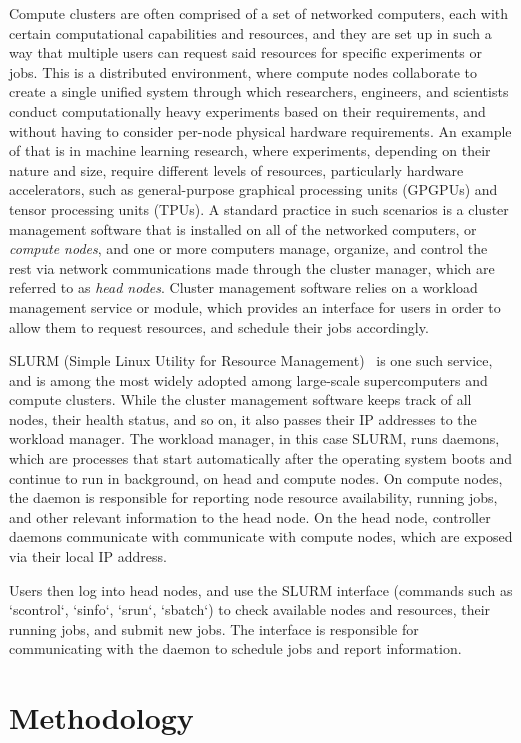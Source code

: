 \documentclass[sigconf]{acmart}
\begin{document}
Compute clusters are often comprised of a set of networked computers, each with certain computational capabilities and 
resources, and they are set up in such a way that multiple users can request said resources for specific experiments or jobs.
This is a distributed environment, where compute nodes collaborate to create a single unified system through which
researchers, engineers, and scientists conduct computationally heavy experiments based on their requirements, and without having
to consider per-node physical hardware requirements.
An example of that is in machine learning research, where experiments, depending on their nature and size, require different
levels of resources, particularly hardware accelerators, such as general-purpose graphical processing units (GPGPUs) and tensor
processing units (TPUs).
A standard practice in such scenarios is a cluster management software that is installed on all of the networked computers, or
\textit{compute nodes}, and one or more computers manage, organize, and control the rest via network communications made through
the cluster manager, which are referred to as \textit{head nodes}.
Cluster management software relies on a workload management service or module, which provides an interface for users in
order to allow them to request resources, and schedule their jobs accordingly.

SLURM (Simple Linux Utility for Resource Management)~\cite{yoo2003slurm} is one such service, and is among the most widely 
adopted among large-scale supercomputers and compute clusters.
While the cluster management software keeps track of all nodes, their health status, and so on, it also passes their IP 
addresses to the workload manager.
The workload manager, in this case SLURM, runs daemons, which are processes that start automatically after 
the operating system boots and continue to run in background, on head and compute nodes.
On compute nodes, the daemon is responsible for reporting node resource availability, running jobs, and other relevant
information to the head node.
On the head node, controller daemons communicate with communicate with compute nodes, which are exposed via their local IP 
address.

Users then log into head nodes, and use the SLURM interface (commands such as `scontrol`, `sinfo`, `srun`, `sbatch`) to check
available nodes and resources, their running jobs, and submit new jobs.
The interface is responsible for communicating with the daemon to schedule jobs and report information.

\section{Methodology}
\end{document}
